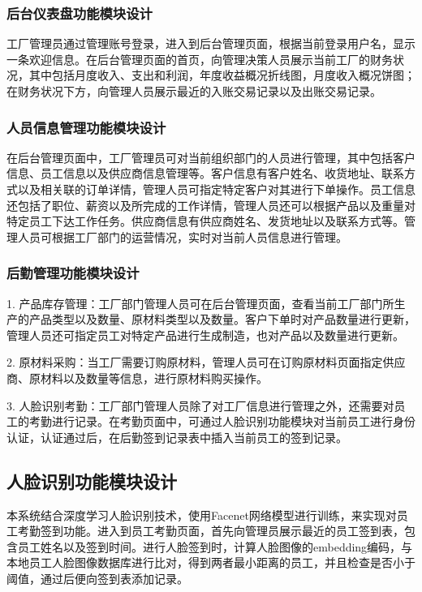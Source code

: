 \subsubsection{后台仪表盘功能模块设计}

工厂管理员通过管理账号登录，进入到后台管理页面，根据当前登录用户名，显示一条欢迎信息。在后台管理页面的首页，向管理决策人员展示当前工厂的财务状况，其中包括月度收入、支出和利润，年度收益概况折线图，月度收入概况饼图；在财务状况下方，向管理人员展示最近的入账交易记录以及出账交易记录。

\subsubsection{人员信息管理功能模块设计}

在后台管理页面中，工厂管理员可对当前组织部门的人员进行管理，其中包括客户信息、员工信息以及供应商信息管理等。客户信息有客户姓名、收货地址、联系方式以及相关联的订单详情，管理人员可指定特定客户对其进行下单操作。员工信息还包括了职位、薪资以及所完成的工作详情，管理人员还可以根据产品以及重量对特定员工下达工作任务。供应商信息有供应商姓名、发货地址以及联系方式等。管理人员可根据工厂部门的运营情况，实时对当前人员信息进行管理。

\subsubsection{后勤管理功能模块设计}

1. 产品库存管理：工厂部门管理人员可在后台管理页面，查看当前工厂部门所生产的产品类型以及数量、原材料类型以及数量。客户下单时对产品数量进行更新，管理人员还可指定员工对特定产品进行生成制造，也对产品以及数量进行更新。

2. 原材料采购：当工厂需要订购原材料，管理人员可在订购原材料页面指定供应商、原材料以及数量等信息，进行原材料购买操作。

3. 人脸识别考勤：工厂部门管理人员除了对工厂信息进行管理之外，还需要对员工的考勤进行记录。在考勤页面中，可通过人脸识别功能模块对当前员工进行身份认证，认证通过后，在后勤签到记录表中插入当前员工的签到记录。

\subsection{人脸识别功能模块设计}

本系统结合深度学习人脸识别技术，使用Facenet网络模型进行训练，来实现对员工考勤签到功能。进入到员工考勤页面，首先向管理员展示最近的员工签到表，包含员工姓名以及签到时间。进行人脸签到时，计算人脸图像的embedding编码，与本地员工人脸图像数据库进行比对，得到两者最小距离的员工，并且检查是否小于阈值，通过后便向签到表添加记录。

